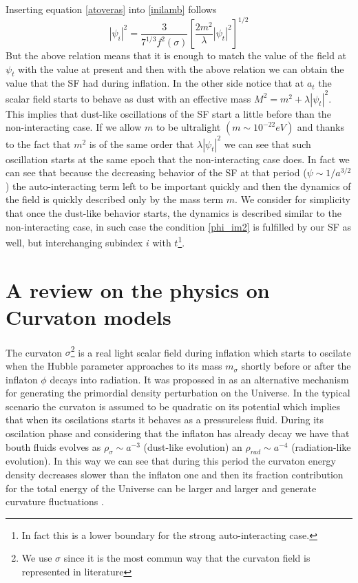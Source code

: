 \documentclass[amssymb,twocolumn,prd,nofootinbib,showpacs]{revtex4-1}
\begin{document}
\begin{itemize}
Inserting equation \eqref{atoveras} into \eqref{inilamb} follows
\begin{equation}\label{inilamb2}
|\psi_i|^2=\frac{3}{7^{1/3}f^2(\sigma)}\left[\frac{2m^2}{\lambda}|\psi_t|^2\right]^{1/2}
\end{equation}
But the above relation means that it is enough to match the value of the field at $\psi_t$ with the value at present and then with the above relation we can obtain the value that the SF had during inflation. In the other side notice that at $a_t$ the scalar field starts to behave as dust with an effective mass $M^2=m^2+\lambda|\psi_t|^2$. This implies that dust-like oscillations of the SF start a little before than the non-interacting case. If we allow $m$ to be ultralight $(m\sim 10^{-22}eV)$ and thanks to the fact that $m^2$ is of the same order that $\lambda|\psi_t|^2$ we can see that such oscillation starts at the same epoch that the non-interacting case does. In fact we can see that because the decreasing behavior of the SF at that period ($\psi\sim 1/a^{3/2}$) the auto-interacting term left to be important quickly and then the dynamics of the field is quickly described only by the mass term $m$. We consider for simplicity that once the dust-like behavior starts, the dynamics is described similar to  the non-interacting case, in such case the condition \eqref{phi_im2} is fulfilled by our SF as well, but interchanging subindex $i$ with $t$\footnote{In fact this is a lower boundary for the strong auto-interacting case.}.
\end{itemize}
\section{A review on the physics on Curvaton models}

The curvaton $\sigma$\footnote{We use $\sigma$ since it is the most commun way that the curvaton field is represented in literature} is a real light scalar field during inflation which starts to oscilate when the Hubble parameter approaches to its mass $m_\sigma$ shortly before or after the inflaton $\phi$ decays into radiation. It was propossed in \cite{curvaton1} as an alternative mechanism for generating the primordial density perturbation on the Universe. In the typical scenario the curvaton is assumed to be quadratic on its potential which implies that when its oscilations starts it behaves as a pressureless fluid. During its oscilation phase and considering that the inflaton has already decay we have that bouth fluids evolves as $\rho_\sigma\sim a^{-3}$ (dust-like evolution) an $\rho_{rad}\sim a^{-4}$ (radiation-like evolution). In this way we can see that during this period the curvaton energy density decreases slower than the inflaton one and then its fraction contribution for the total energy of the Universe can be larger and larger and generate curvature fluctuations \cite{curvaton1}.
\end{document}
